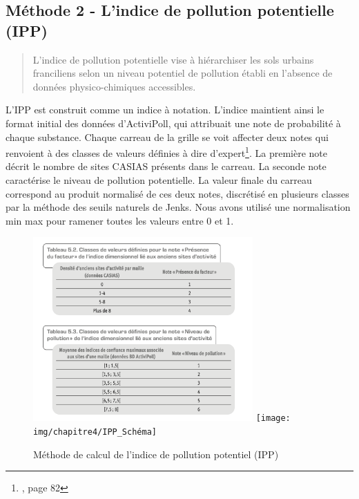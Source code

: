 \documentclass[a4paper,twoside,12pt]{book}
\begin{document}
\subsection{Méthode 2 - L'indice de pollution potentielle (IPP)}

\begin{quote}
\og{} L'indice de pollution potentielle vise à hiérarchiser les sols urbains franciliens selon un niveau potentiel de pollution établi en l'absence de données physico-chimiques accessibles. \fg{}
\end{quote}

L'IPP est construit comme un indice à notation. L'indice maintient ainsi le format initial des données d'ActiviPoll, qui attribuait une note de probabilité à chaque substance. Chaque carreau de la grille se voit \og{}affecter deux notes qui renvoient à des classes de valeurs définies à dire d'expert\fg{}\footnote{\cite{charvet_sols_2024}, page 82}. La première note décrit le nombre de sites CASIAS présents dans le carreau. La seconde note caractérise le niveau de pollution potentielle. La valeur finale du carreau correspond au produit normalisé de ces deux notes, discrétisé en plusieurs classes par la méthode des seuils naturels de Jenks. Nous avons utilisé une normalisation min max pour ramener toutes les valeurs entre 0 et 1. 

\begin{figure}[!h]  
\centering   
\includegraphics[width=0.75\textwidth]{img/chapitre4/IPP_2_Notes} 
\hspace{0.05\textwidth}
\texttt{[image: img/chapitre4/IPP\_Schéma]} 
\caption{Méthode de calcul de l'indice de pollution potentiel (IPP)}  
\label{fig:calcul_IPP}   
\end{figure}  
\end{document}
